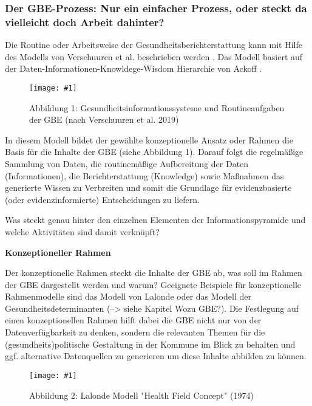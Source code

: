 \documentclass{article}
\newlength{\imgwidth}
\newcommand\scaledgraphics[2]{%
                
\settowidth{\imgwidth}{\texttt{[image: \#1]}}%
                
\setlength{\imgwidth}{\minof{\imgwidth}{#2\textwidth}}%
                
\texttt{[image: \#1]}%
                
}
\begin{document}
\subsubsection{Der GBE-Prozess: Nur ein einfacher Prozess, oder steckt da vielleicht doch Arbeit dahinter? }\label{H7691965}



Die Routine oder Arbeitsweise der Gesundheitsberichterstattung kann mit Hilfe des Modells von Verschuuren et al. beschrieben werden \autocite{VerschuurenMariekeundweitere2019}. Das Modell basiert auf der Daten-Informationen-Knowldege-Wisdom Hierarchie von Ackoff \autocite{AckoffRL1989}.

\begin{figure}
\scaledgraphics{fb2e8480-f6ad-4142-bd74-cfdcfa3a8d6e.jpg}{1}
\caption*{Abbildung 1: Gesundheitsinformationssysteme und Routineaufgaben der GBE (nach Verschuuren et al. 2019)}\label{F92928341}
\end{figure}


In diesem Modell bildet der gewählte konzeptionelle Ansatz oder Rahmen die Basis für die Inhalte der GBE (siehe Abbildung 1).  Darauf folgt die regelmäßige Sammlung von Daten, die routinemäßige Aufbereitung der Daten (Informationen), die Berichterstattung (Knowledge) sowie Maßnahmen das generierte Wissen zu Verbreiten und somit die Grundlage für evidenzbasierte (oder evidenzinformierte) Entscheidungen zu liefern.


Was steckt genau hinter den einzelnen Elementen der Informationspyramide und welche Aktivitäten sind damit verknüpft?


\textbf{Konzeptioneller Rahmen}


Der konzeptionelle Rahmen steckt die Inhalte der GBE ab, was soll im Rahmen der GBE dargestellt werden und warum? Geeignete Beispiele für konzeptionelle Rahmenmodelle sind das Modell von Lalonde \autocite{LalondeMarc1974} oder das Modell der Gesundheitsdeterminanten (--> siehe Kapitel Wozu GBE?). Die Festlegung auf einen konzeptionellen Rahmen hilft dabei die GBE nicht nur von der Datenverfügbarkeit zu denken, sondern die relevanten Themen für die (gesundheits)politische Gestaltung in der Kommune im Blick zu behalten und ggf. alternative Datenquellen zu generieren um diese Inhalte abbilden zu können. 

\begin{figure}
\scaledgraphics{dddd6380-8cb3-4fc2-957b-6e99978a32b7.jpg}{1}
\caption*{Abbildung 2: Lalonde Modell "Health Field Concept" (1974)}\label{F76014001}
\end{figure}
\end{document}
